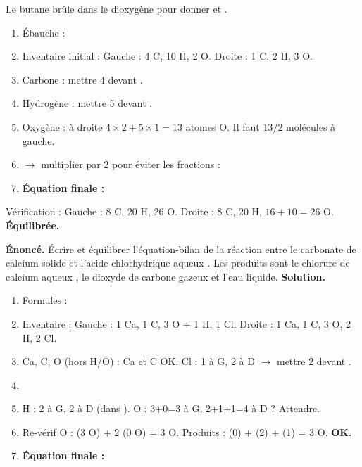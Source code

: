 \documentclass[11pt]{article}
\begin{document}
\begin{exemplebox}
Le butane  brûle dans le dioxygène pour donner  et .
\begin{enumerate}
\item Ébauche : 
\item Inventaire initial : Gauche : 4 C, 10 H, 2 O. Droite : 1 C, 2 H, 3 O.
\item Carbone : mettre 4 devant . 
\item Hydrogène : mettre 5 devant . 
\item Oxygène : à droite $4\times2 + 5\times1 = 13$ atomes O. Il faut $13/2$ molécules  à gauche.
\item {} $\to$ multiplier par 2 pour éviter les fractions :
\item \textbf{Équation finale :} 
\end{enumerate}
Vérification : Gauche : 8 C, 20 H, 26 O. Droite : 8 C, 20 H, $16+10=26$ O. \textbf{Équilibrée.}
\end{exemplebox}

\begin{exoresolu}
\textbf{Énoncé.} Écrire et équilibrer l'équation-bilan de la réaction entre le carbonate de calcium solide  et l'acide chlorhydrique aqueux . Les produits sont le chlorure de calcium aqueux , le dioxyde de carbone gazeux  et l'eau liquide.
\tcblower
\textbf{Solution.}
\begin{enumerate}
\item Formules : 
\item Inventaire : Gauche : 1 Ca, 1 C, 3 O + 1 H, 1 Cl. Droite : 1 Ca, 1 C, 3 O, 2 H, 2 Cl.
\item Ca, C, O (hors H/O) : Ca et C OK. Cl : 1 à G, 2 à D $\to$ mettre 2 devant .
\item {}
\item H : 2 à G, 2 à D (dans ). O : 3+0=3 à G, 2+1+1=4 à D ? Attendre.
\item Re-vérif O :  (3 O) + 2 (0 O) = 3 O. Produits :  (0) +  (2) +  (1) = 3 O. \textbf{OK.}
\item \textbf{Équation finale :} 
\end{enumerate}
\end{exoresolu}
\end{document}
